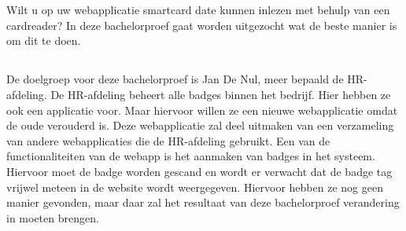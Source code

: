 
\chapter{}%
\label{ch:inleiding}

Wilt u op uw webapplicatie smartcard date kunnen inlezen met behulp van een cardreader? In deze bachelorproef gaat worden uitgezocht wat de beste manier is om dit te doen.




\section{}%
\label{sec:probleemstelling}

De doelgroep voor deze bachelorproef is Jan De Nul, meer bepaald de HR-afdeling. De HR-afdeling beheert alle badges binnen het bedrijf. Hier hebben ze ook een applicatie voor. Maar hiervoor willen ze een nieuwe webapplicatie omdat de oude verouderd is. Deze webapplicatie zal deel uitmaken van een verzameling van andere webapplicaties die de HR-afdeling gebruikt. Een van de functionaliteiten van de webapp is het aanmaken van badges in het systeem. Hiervoor moet de badge worden gescand en wordt er verwacht dat de badge tag vrijwel meteen in de website wordt weergegeven. Hiervoor hebben ze nog geen manier gevonden, maar daar zal het resultaat van deze bachelorproef verandering in moeten brengen.

